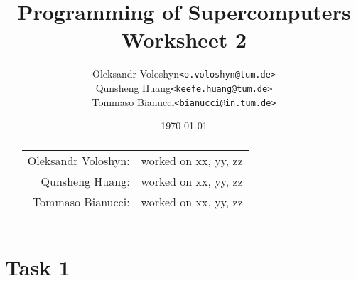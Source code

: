 \documentclass{article}
\title{Programming of Supercomputers\\Worksheet 2}
\author{
	\begin{tabular}{rl}
		Oleksandr Voloshyn& \texttt{<o.voloshyn@tum.de>}\\ 
		Qunsheng Huang& \texttt{<keefe.huang@tum.de>}\\ 
		Tommaso Bianucci& \texttt{<bianucci@in.tum.de>}
	\end{tabular}
}
\date{\today}
\begin{document}
\maketitle
\renewcommand{\abstractname}{Group members's contributions}
\begin{abstract}
	\begin{center}
		\begin{tabular}{rl}
		Oleksandr Voloshyn:& worked on xx, yy, zz\\
		Qunsheng Huang:& worked on xx, yy, zz\\
		Tommaso Bianucci:& worked on xx, yy, zz
		\end{tabular}
	\end{center}
\end{abstract}

\section{Task 1}
\end{document}
